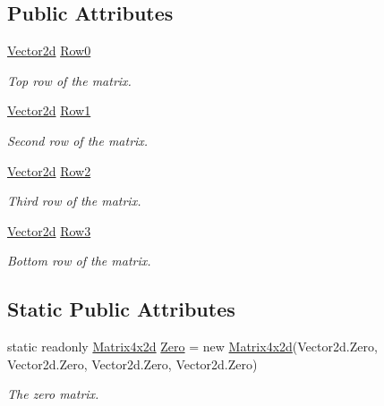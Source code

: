 \subsection*{Public Attributes}
\begin{DoxyCompactItemize}
\item 
\hyperlink{struct_open_t_k_1_1_vector2d}{Vector2d} \hyperlink{struct_open_t_k_1_1_matrix4x2d_aa5fa57688732356cd46e5a28035b900b}{Row0}
\begin{DoxyCompactList}\small\item\em Top row of the matrix. \end{DoxyCompactList}\item 
\hyperlink{struct_open_t_k_1_1_vector2d}{Vector2d} \hyperlink{struct_open_t_k_1_1_matrix4x2d_a620a5831b876a8543746d6828d6aaeb4}{Row1}
\begin{DoxyCompactList}\small\item\em Second row of the matrix. \end{DoxyCompactList}\item 
\hyperlink{struct_open_t_k_1_1_vector2d}{Vector2d} \hyperlink{struct_open_t_k_1_1_matrix4x2d_aeee8adbe3dcc186341e52e8b2b56d6a4}{Row2}
\begin{DoxyCompactList}\small\item\em Third row of the matrix. \end{DoxyCompactList}\item 
\hyperlink{struct_open_t_k_1_1_vector2d}{Vector2d} \hyperlink{struct_open_t_k_1_1_matrix4x2d_addbe352fa25f7c2ff87115b60c8361f3}{Row3}
\begin{DoxyCompactList}\small\item\em Bottom row of the matrix. \end{DoxyCompactList}\end{DoxyCompactItemize}
\subsection*{Static Public Attributes}
\begin{DoxyCompactItemize}
\item 
static readonly \hyperlink{struct_open_t_k_1_1_matrix4x2d}{Matrix4x2d} \hyperlink{struct_open_t_k_1_1_matrix4x2d_a1ca97c740ce1af90824f1a2d61c45900}{Zero} = new \hyperlink{struct_open_t_k_1_1_matrix4x2d}{Matrix4x2d}(Vector2d.\-Zero, Vector2d.\-Zero, Vector2d.\-Zero, Vector2d.\-Zero)
\begin{DoxyCompactList}\small\item\em The zero matrix. \end{DoxyCompactList}\end{DoxyCompactItemize}
